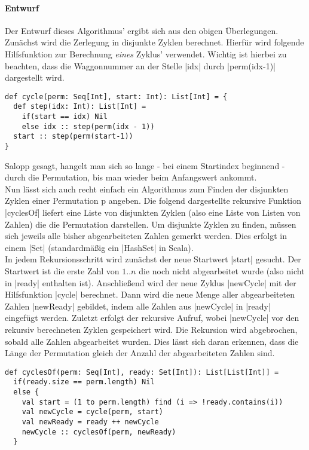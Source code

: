 \paragraph{Entwurf}
Der Entwurf dieses Algorithmus' ergibt sich aus den obigen Überlegungen. Zunächst wird die Zerlegung in disjunkte Zyklen berechnet.
Hierfür wird folgende Hilfsfunktion zur Berechnung \emph{eines} Zyklus' verwendet.
Wichtig ist hierbei zu beachten, dass die Waggonnummer an der Stelle |idx| durch |perm(idx-1)| dargestellt wird.
\lstset{language=Scala}
\lstset{basicstyle=\small}
\begin{lstlisting}
def cycle(perm: Seq[Int], start: Int): List[Int] = {
  def step(idx: Int): List[Int] =
    if(start == idx) Nil
    else idx :: step(perm(idx - 1))
  start :: step(perm(start-1))
}
\end{lstlisting}
Salopp gesagt, hangelt man sich so lange - bei einem Startindex beginnend - durch die Permutation, bis man wieder beim Anfangswert ankommt.\\
Nun lässt sich auch recht einfach ein Algorithmus zum Finden der disjunkten Zyklen einer Permutation p angeben.
Die folgend dargestellte rekursive Funktion |cyclesOf| liefert eine Liste von disjunkten Zyklen (also eine Liste von Listen von Zahlen)
die die Permutation darstellen. Um disjunkte Zyklen zu finden, müssen sich jeweils alle bisher abgearbeiteten Zahlen gemerkt werden.
Dies erfolgt in einem |Set| (standardmäßig ein |HashSet| in Scala). \\
In jedem Rekursionsschritt wird zunächst der neue Startwert |start| gesucht.
Der Startwert ist die erste Zahl von $1..n$ die noch nicht abgearbeitet wurde (also nicht in |ready| enthalten ist).
Anschließend wird der neue Zyklus |newCycle| mit der Hilfsfunktion |cycle| berechnet.
Dann wird die neue Menge aller abgearbeiteten Zahlen |newReady| gebildet, indem alle Zahlen aus |newCycle| in |ready| eingefügt werden.
Zuletzt erfolgt der rekursive Aufruf, wobei |newCycle| vor den rekursiv berechneten Zyklen gespeichert wird.
Die Rekursion wird abgebrochen, sobald alle Zahlen abgearbeitet wurden. Dies lässt sich daran erkennen,
dass die Länge der Permutation gleich der Anzahl der abgearbeiteten Zahlen sind. \\
\lstset{language=Scala}
\lstset{basicstyle=\small}
\begin{lstlisting}
def cyclesOf(perm: Seq[Int], ready: Set[Int]): List[List[Int]] =
  if(ready.size == perm.length) Nil
  else {
    val start = (1 to perm.length) find (i => !ready.contains(i))
    val newCycle = cycle(perm, start)
    val newReady = ready ++ newCycle
    newCycle :: cyclesOf(perm, newReady)
  }
\end{lstlisting}

